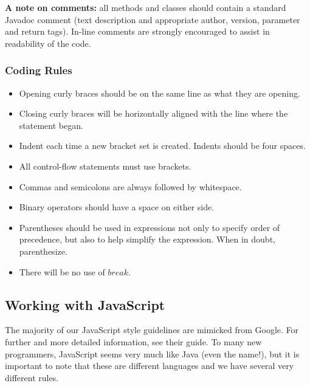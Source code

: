 \documentclass[12pt]{article}
\begin{document}
\textbf{A note on comments:} all methods and classes should contain a standard Javadoc comment (text description and appropriate author, version, parameter and return tags).  In-line comments are strongly encouraged to assist in readability of the code.



\subsubsection{Coding Rules}

\begin{itemize}

\item Opening curly braces should be on the same line as what they are opening.

\item Closing curly braces will be horizontally aligned with the line where the statement began.

\item Indent each time a new bracket set is created.  Indents should be four spaces.

\item All control-flow statements must use brackets.

\item Commas and semicolons are always followed by whitespace.

\item Binary operators should have a space on either side.

\item Parentheses should be used in expressions not only to specify order of precedence, but also to help simplify the expression. When in doubt, parenthesize.

\item There will be no use of $break$.

\end{itemize}





\subsection{Working with JavaScript}

The majority of our JavaScript style guidelines are mimicked from Google\cite{JavaScriptStyle-Google}.  For further and more detailed information, see their guide.  To many new programmers, JavaScript seems very much like Java (even the name!), but it is important to note that these are different languages and we have several very different rules.
\end{document}
